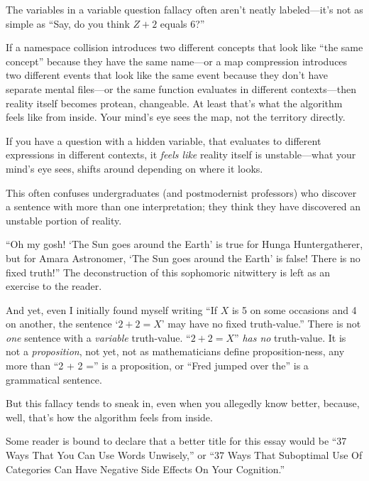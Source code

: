 {
 The variables in a variable question fallacy often
aren't neatly labeled---it's not as
simple as ``Say, do you think $Z + 2$ equals
6?''}

{
 If a namespace collision introduces two different concepts that
look like ``the same concept''
because they have the same name---or a map compression introduces two
different events that look like the same event because they
don't have separate mental files---or the same function
evaluates in different contexts---then reality itself becomes protean,
changeable. At least that's what the algorithm feels
like from inside. Your mind's eye sees the map, not the
territory directly.}

{
 If you have a question with a hidden variable, that evaluates to
different expressions in different contexts, it \textit{feels like}
reality itself is unstable---what your mind's eye sees,
shifts around depending on where it looks.}

{
 This often confuses undergraduates (and postmodernist professors)
who discover a sentence with more than one interpretation; they think
they have discovered an unstable portion of reality.}

{
 ``Oh my gosh! `The Sun goes around
the Earth' is true for Hunga Huntergatherer, but for
Amara Astronomer, `The Sun goes around the
Earth' is false! There is no fixed
truth!'' The deconstruction of this sophomoric
nitwittery is left as an exercise to the reader.}

{
 And yet, even I initially found myself writing
``If $X$ is 5 on some occasions and 4 on another, the
sentence `$2 + 2 = X$' may have no fixed
truth-value.'' There is not \textit{one} sentence
with a \textit{variable} truth-value. ``$2 + 2 =
X$'' \textit{has no} truth-value. It is not a
\textit{proposition}, not yet, not as mathematicians define
proposition-ness, any more than ``2 + 2
='' is a proposition, or ``Fred
jumped over the'' is a grammatical sentence.}

{
 But this fallacy tends to sneak in, even when you allegedly know
better, because, well, that's how the algorithm feels
from inside.}

\myendsectiontext


{
 Some reader is bound to declare that a better title for this essay
would be ``37 Ways That You Can Use Words
Unwisely,'' or ``37 Ways That
Suboptimal Use Of Categories Can Have Negative Side Effects On Your
Cognition.'' }

